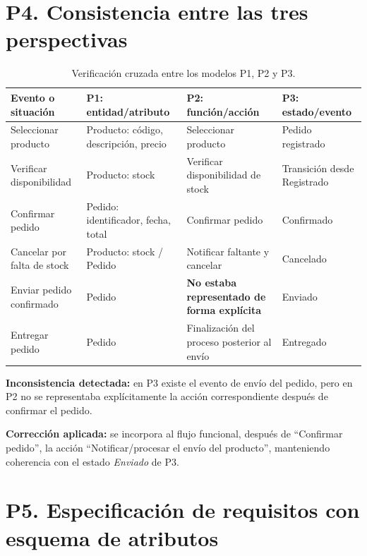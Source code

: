 \documentclass[12pt,a4paper]{article}
\begin{document}
\section{P4. Consistencia entre las tres perspectivas}

\begin{table}[H]
\centering
\small
\begin{tabularx}{\textwidth}{|p{3.2cm}|X|X|X|}
\hline
\textbf{Evento o situación} & \textbf{P1: entidad/atributo} & \textbf{P2: función/acción} & \textbf{P3: estado/evento} \\
\hline
Seleccionar producto & Producto: código, descripción, precio & Seleccionar producto & Pedido registrado \\
\hline
Verificar disponibilidad & Producto: stock & Verificar disponibilidad de stock & Transición desde Registrado \\
\hline
Confirmar pedido & Pedido: identificador, fecha, total & Confirmar pedido & Confirmado \\
\hline
Cancelar por falta de stock & Producto: stock / Pedido & Notificar faltante y cancelar & Cancelado \\
\hline
Enviar pedido confirmado & Pedido & \textbf{No estaba representado de forma explícita} & Enviado \\
\hline
Entregar pedido & Pedido & Finalización del proceso posterior al envío & Entregado \\
\hline
\end{tabularx}
\caption{Verificación cruzada entre los modelos P1, P2 y P3.}
\end{table}

\textbf{Inconsistencia detectada:} en P3 existe el evento de envío del pedido, pero en P2 no se representaba explícitamente la acción correspondiente después de confirmar el pedido.

\textbf{Corrección aplicada:} se incorpora al flujo funcional, después de ``Confirmar pedido'', la acción ``Notificar/procesar el envío del producto'', manteniendo coherencia con el estado \textit{Enviado} de P3.

\section{P5. Especificación de requisitos con esquema de atributos}
\end{document}
